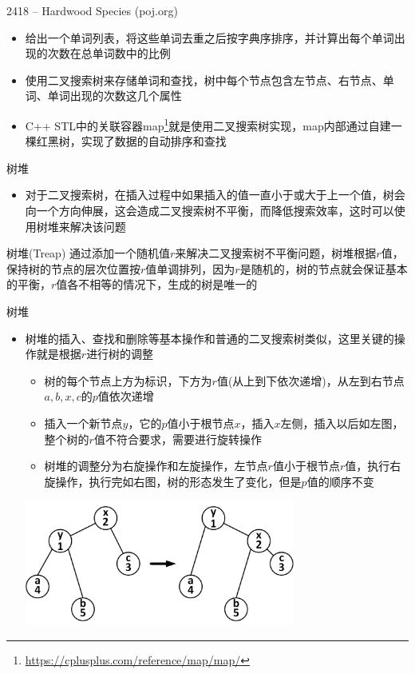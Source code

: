 \begin{frame}{2418 -- Hardwood Species (poj.org)}
    \begin{itemize}
        \item 给出一个单词列表，将这些单词去重之后按字典序排序，并计算出每个单词出现的次数在总单词数中的比例
        \vfill
        \item 使用二叉搜索树来存储单词和查找，树中每个节点包含左节点、右节点、单词、单词出现的次数这几个属性
        \vfill
        \item C++ STL中的关联容器map\footnote{\url{https://cplusplus.com/reference/map/map/}}就是使用二叉搜索树实现，map内部通过自建一棵红黑树，实现了数据的自动排序和查找
    \end{itemize}
\end{frame}
\begin{frame}{树堆}
    \begin{itemize}
        \item  对于二叉搜索树，在插入过程中如果插入的值一直小于或大于上一个值，树会向一个方向伸展，这会造成二叉搜索树不平衡，而降低搜索效率，这时可以使用树堆来解决该问题
    \end{itemize}
    \vfill
    \begin{block}{树堆(Treap)}
        通过添加一个随机值$r$来解决二叉搜索树不平衡问题，树堆根据$r$值，保持树的节点的层次位置按$r$值单调排列，因为$r$是随机的，树的节点就会保证基本的平衡，$r$值各不相等的情况下，生成的树是唯一的
    \end{block}
\end{frame}
\begin{frame}{树堆}
    \begin{itemize}
        \item 树堆的插入、查找和删除等基本操作和普通的二叉搜索树类似，这里关键的操作就是根据$r$进行树的调整
        \begin{itemize}
            \item 树的每个节点上方为标识，下方为$r$值(从上到下依次递增)，从左到右节点$a,b,x,c$的$p$值依次递增
            \item 插入一个新节点$y$，它的$p$值小于根节点$x$，插入$x$左侧，插入以后如左图，整个树的$r$值不符合要求，需要进行旋转操作
            \item 树堆的调整分为右旋操作和左旋操作，左节点$r$值小于根节点$r$值，执行右旋操作，执行完如右图，树的形态发生了变化，但是$p$值的顺序不变
        \end{itemize}
        \includegraphics[width=0.7\textwidth,center]{fig/6-7.png}
    \end{itemize}
\end{frame}
